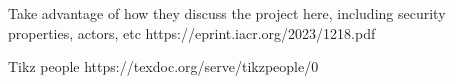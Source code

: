 Take advantage of how they discuss the project here, including security properties, actors, etc
https://eprint.iacr.org/2023/1218.pdf

Tikz people
https://texdoc.org/serve/tikzpeople/0
